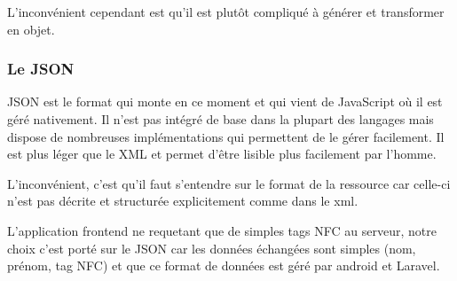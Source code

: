 L'inconvénient cependant est qu'il est plutôt compliqué à générer et transformer
en objet.

\subsubsection{Le JSON}

JSON est le format qui monte en ce moment et qui vient de JavaScript où il est géré
nativement. Il n'est pas intégré de base dans la plupart des langages mais dispose
de nombreuses implémentations qui permettent de le gérer facilement. Il est plus
léger que le XML et permet d'être lisible plus facilement par l'homme.

L'inconvénient, c'est qu'il faut s'entendre sur le format de la ressource car celle-ci
n'est pas décrite et structurée explicitement comme dans le xml.

L'application frontend ne requetant que de simples tags NFC au serveur, notre
choix c'est porté sur le JSON car les données échangées sont simples (nom, prénom,
tag NFC) et que ce format de données est géré par android et Laravel.
